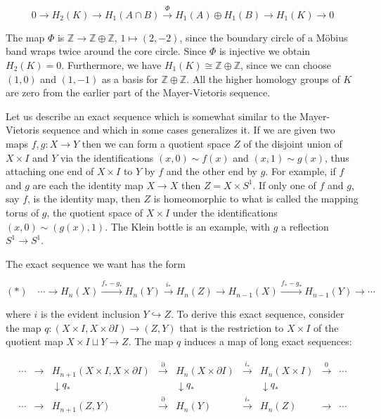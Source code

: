 \[0 \to H_2(K) \to H_1(A \cap B) \xrightarrow{\Phi} H_1(A) \oplus H_1(B) \to H_1(K) \to 0\]

The map $\Phi$ is $\mathbb{Z} \to \mathbb{Z} \oplus \mathbb{Z}$, $1 \mapsto (2, -2)$, since the boundary circle of a M\"{o}bius band wraps twice around the core circle. Since $\Phi$ is injective we obtain $H_2(K) = 0$. Furthermore, we have $H_1(K) \cong \mathbb{Z} \oplus \mathbb{Z}$, since we can choose $(1, 0)$ and $(1, -1)$ as a basis for $\mathbb{Z} \oplus \mathbb{Z}$. All the higher homology groups of $K$ are zero from the earlier part of the Mayer-Vietoris sequence.

\begin{example}
\label{ex:homology-mapping-torus}
Let us describe an exact sequence which is somewhat similar to the Mayer-Vietoris sequence and which in some cases generalizes it. If we are given two maps $f, g: X \to Y$ then we can form a quotient space $Z$ of the disjoint union of $X \times I$ and $Y$ via the identifications $(x, 0) \sim f(x)$ and $(x, 1) \sim g(x)$, thus attaching one end of $X \times I$ to $Y$ by $f$ and the other end by $g$. For example, if $f$ and $g$ are each the identity map $X \to X$ then $Z = X \times S^1$. If only one of $f$ and $g$, say $f$, is the identity map, then $Z$ is homeomorphic to what is called the mapping torus of $g$, the quotient space of $X \times I$ under the identifications $(x, 0) \sim (g(x), 1)$. The Klein bottle is an example, with $g$ a reflection $S^1 \to S^1$.
\end{example}

The exact sequence we want has the form

\[(*) \quad \cdots \to H_n(X) \xrightarrow{f_* - g_*} H_n(Y) \xrightarrow{i_*} H_n(Z) \to H_{n-1}(X) \xrightarrow{f_* - g_*} H_{n-1}(Y) \to \cdots\]

where $i$ is the evident inclusion $Y \hookrightarrow Z$. To derive this exact sequence, consider the map $q: (X \times I, X \times \partial I) \to (Z, Y)$ that is the restriction to $X \times I$ of the quotient map $X \times I \sqcup Y \to Z$. The map $q$ induces a map of long exact sequences:

\[\begin{array}{ccccccccc}
\cdots & \to & H_{n+1}(X \times I, X \times \partial I) & \xrightarrow{\partial} & H_n(X \times \partial I) & \xrightarrow{i_*} & H_n(X \times I) & \xrightarrow{0} & \cdots \\
& & \downarrow q_* & & \downarrow q_* & & \downarrow q_* & & \\
\cdots & \to & H_{n+1}(Z, Y) & \xrightarrow{\partial} & H_n(Y) & \xrightarrow{i_*} & H_n(Z) & \to & \cdots
\end{array}\]


